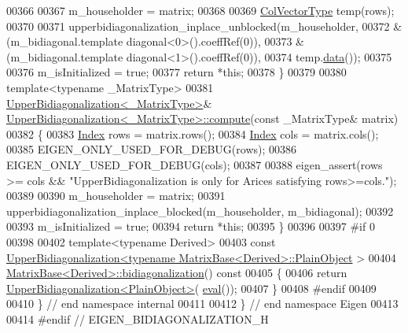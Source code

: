 \begin{DoxyCode}
00366 
00367   m\_householder = matrix;
00368 
00369   \hyperlink{group___core___module_class_eigen_1_1_matrix}{ColVectorType} temp(rows);
00370 
00371   upperbidiagonalization\_inplace\_unblocked(m\_householder,
00372                                            &(m\_bidiagonal.template diagonal<0>().coeffRef(0)),
00373                                            &(m\_bidiagonal.template diagonal<1>().coeffRef(0)),
00374                                            temp.\hyperlink{class_eigen_1_1_plain_object_base_ac25699535374b1854cf8494e44ad31b2}{data}());
00375 
00376   m\_isInitialized = \textcolor{keyword}{true};
00377   \textcolor{keywordflow}{return} *\textcolor{keyword}{this};
00378 \}
00379 
00380 \textcolor{keyword}{template}<\textcolor{keyword}{typename} \_MatrixType>
00381 \hyperlink{class_eigen_1_1internal_1_1_upper_bidiagonalization}{UpperBidiagonalization<\_MatrixType>}& 
      \hyperlink{class_eigen_1_1internal_1_1_upper_bidiagonalization}{UpperBidiagonalization<\_MatrixType>::compute}(\textcolor{keyword}{const} \_MatrixType&
       matrix)
00382 \{
00383   \hyperlink{class_eigen_1_1internal_1_1_upper_bidiagonalization_adcb14f3919a3dcc9977ba6b8105087fe}{Index} rows = matrix.rows();
00384   \hyperlink{class_eigen_1_1internal_1_1_upper_bidiagonalization_adcb14f3919a3dcc9977ba6b8105087fe}{Index} cols = matrix.cols();
00385   EIGEN\_ONLY\_USED\_FOR\_DEBUG(rows);
00386   EIGEN\_ONLY\_USED\_FOR\_DEBUG(cols);
00387 
00388   eigen\_assert(rows >= cols && \textcolor{stringliteral}{"UpperBidiagonalization is only for Arices satisfying rows>=cols."});
00389 
00390   m\_householder = matrix;
00391   upperbidiagonalization\_inplace\_blocked(m\_householder, m\_bidiagonal);
00392             
00393   m\_isInitialized = \textcolor{keyword}{true};
00394   \textcolor{keywordflow}{return} *\textcolor{keyword}{this};
00395 \}
00396 
00397 \textcolor{preprocessor}{#if 0}
00398 
00402 \textcolor{keyword}{template}<\textcolor{keyword}{typename} Derived>
00403 \textcolor{keyword}{const} \hyperlink{class_eigen_1_1internal_1_1_upper_bidiagonalization}{UpperBidiagonalization<typename MatrixBase<Derived>::PlainObject}
      >
00404 \hyperlink{group___core___module_class_eigen_1_1_matrix_base}{MatrixBase<Derived>::bidiagonalization}()\textcolor{keyword}{ const}
00405 \textcolor{keyword}{}\{
00406   \textcolor{keywordflow}{return} \hyperlink{class_eigen_1_1internal_1_1_upper_bidiagonalization}{UpperBidiagonalization<PlainObject>}(
      \hyperlink{struct_eigen_1_1internal_1_1eval}{eval}());
00407 \}
00408 \textcolor{preprocessor}{#endif}
00409 
00410 \} \textcolor{comment}{// end namespace internal}
00411 
00412 \} \textcolor{comment}{// end namespace Eigen}
00413 
00414 \textcolor{preprocessor}{#endif // EIGEN\_BIDIAGONALIZATION\_H}
\end{DoxyCode}
